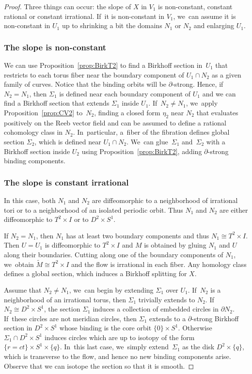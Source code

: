 \begin{proof}
Three things can occur: the slope of $X$ in $V_1$ is non-constant, constant rational or constant irrational. If~it is non-constant in $V_1$, we~can assume it is non-constant in $U_1$ up to shrinking a bit the domains $N_1$ or $N_2$ and enlarging $U_1$.

\subsubsection*{The slope is non-constant} We can use Proposition~\ref{prop:BirkT2} to find a Birkhoff section in~$U_1$ that restricts to each torus fiber near the boundary component of $U_1\cap N_2$ as a given family of curves. Notice that the binding orbits will be $\partial$-strong. Hence, if~$N_2=N_1$, then $\Sigma_1$ is defined near each boundary component of $U_1$ and we can find a Birkhoff section that extends $\Sigma_1$ inside $U_1$. If~$N_2\neq N_1$, we~apply Proposition~\ref{prop:CV2} to~$N_2$, finding a closed form $\eta_2$ near $N_2$ that evaluates positively on the Reeb vector field and can be assumed to define a rational cohomology class in $N_2$. In~particular, a~fiber of the fibration defines global section $\Sigma_2$, which is defined near $U_1\cap N_2$. We~can glue~$\Sigma_1$ and~$\Sigma_2$ with a Birkhoff section inside $U_2$ using Proposition~\ref{prop:BirkT2}, adding $\partial$-strong binding components.

\subsubsection*{The slope is constant irrational}
In this case, both $N_1$ and $N_2$ are diffeomorphic to a neighborhood of irrational tori or to a neighborhood of an isolated periodic orbit. Thus $N_1$ and $N_2$ are either diffeomorphic to $T^2\times I$ or to $D^2\times S^1$.

If $N_2=N_1$, then $N_1$ has at least two boundary components and thus $N_1\cong T^2\times I$. Then $U=U_1$ is diffeomorphic to $T^2\times I$ and $M$ is obtained by gluing $N_1$ and $U$ along their boundaries. Cutting along one of the boundary components of $N_1$, we~obtain $\widetilde{M}\cong T^2\times I$ and the flow is irrational in each fiber. Any homology class defines a global section, which induces a Birkhoff splitting for $X$.

Assume that $N_2\neq N_1$, we~can begin by extending $\Sigma_1$ over $U_1$. If~$N_2$ is a neighborhood of an irrational torus, then $\Sigma_1$ trivially extends to $N_2$.
If $N_2\cong D^2\times S^1$, the section $\Sigma_1$ induces a collection of embedded circles in $\partial N_2$. If~these circles are not meridian circles, then $\Sigma_1$ extends to a $\partial$-strong Birkhoff section in $D^2\times S^1$ whose binding is the core orbit $\{0\}\times S^1$. Otherwise $\Sigma_1\cap D^2\times S^1$ induces circles which are up to isotopy of the form $\{r=ct\}\times S^1 \times \{q\}$. In~this last case, we~simply extend~$\Sigma_1$ as the disk $D^2\times \{q\}$, which is transverse to the flow, and hence no new binding components arise. Observe that we can isotope the section so that it is smooth.


\end{proof}
